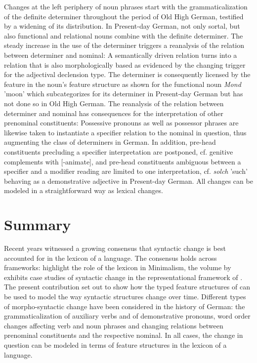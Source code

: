 \documentclass[output=paper]{langsci/langscibook}
\begin{document}
Changes at the left periphery of noun phrases start with the grammaticalization of the definite determiner throughout the period of Old High German, testified by a widening of its distribution. In Present-day German, not only sortal, but also functional and relational nouns combine with the definite determiner. The steady increase in the use of the determiner triggers a reanalysis of the relation between determiner and nominal: A semantically driven relation turns into a relation that is also morphologically based as evidenced by the changing trigger for the adjectival declension type. The determiner is consequently licensed by the \cat feature in the noun's feature structure as shown for the functional noun \textit{Mond} 'moon' which subcategorizes for its determiner in Present-day German but has not done so in Old High German.
\ea \label{noun}
\z 
The reanalysis of the relation between determiner and nominal has consequences for the interpretation of other prenominal constituents: Possessive pronouns as well as possessor phrases are likewise taken to instantiate a specifier relation to the nominal in question, thus augmenting the class of determiners in German. In addition, pre-head constituents precluding a specifier interpretation are postponed, cf. genitive complements with [-animate], and pre-head constituents ambiguous between a specifier and a modifier reading are limited to one interpretation, cf. \textit{solch} 'such' behaving as a demonstrative adjective in Present-day German. All changes can be modeled in a straightforward way as lexical changes.  

\section{Summary} 

Recent years witnessed a growing consensus that syntactic change is best accounted for in the lexicon of a language. The consensus holds across frameworks: \cite{BiWa2015} highlight the role of the lexicon in Minimalism, the volume by \cite{BuKi2001} exhibits case studies of syntactic change in the representational framework of \lfg. The present contribution set out to show how the typed feature structures of \hpsg can be used to model the way syntactic structures change over time. Different types of morpho-syntactic change have been considered in the history of German: the grammaticalization of auxiliary verbs and of demonstrative pronouns, word order changes affecting verb and noun phrases and changing relations between prenominal constituents and the respective nominal. In all cases, the change in question can be modeled in terms of feature structures in the lexicon of a language.  
\end{document}
